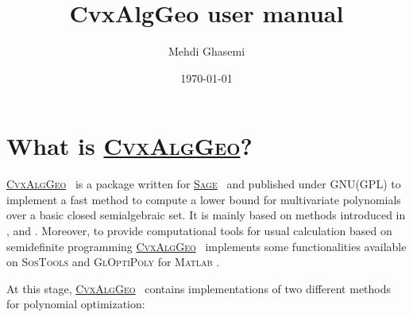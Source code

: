 \documentclass{amsart}
\theoremstyle{definition}
\newcommand{\sage}{\href{http://www.sagemath.org}{\textsc{Sage}}}
\newcommand{\cvxalggeo}{\href{https://docs.google.com/open?id=0B16xZ-lflLrZZGMwN2I1MGItNzk5Mi00OGIxLTljZjgtYTgxMmUyMTZiZGU4}{\textsc{CvxAlgGeo}}}
\begin{document}
\title{CvxAlgGeo user manual}
%
\author[M. Ghasemi]{Mehdi Ghasemi}
%
\address{Department of Mathematics and Statistics,\newline\indent
University of Saskatchewan,\newline\indent
Saskatoon, SK. S7N 5E6, Canada}
%
%
%


\date{\today}


\maketitle


\section{What is \cvxalggeo?}

\cvxalggeo~ is a package written for \sage~ and published under GNU(GPL) to implement a fast method to compute a lower bound for multivariate 
polynomials over a basic closed semialgebraic set. It is mainly based on methods introduced in \cite{lbgp}, \cite{lbgpLasserre} and \cite{genlbgp}. 
Moreover, to provide computational tools for usual calculation based on semidefinite programming \cvxalggeo~ implements some functionalities 
available on \textsc{SosTools} and \textsc{GlOptiPoly} for \textsc{Matlab} \cite{gloptipoly, sostools}.

At this stage, \cvxalggeo~ contains implementations of two different methods for polynomial optimization:
\end{document}
